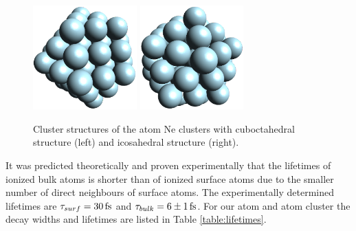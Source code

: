 \begin{figure}[h]
 \centering
 \includegraphics[height=4cm]{pics/fcc.png}
 \hspace{2cm}
 \includegraphics[height=4cm]{pics/ico.png}
 \caption{Cluster structures of the \unit[55]{atom} Ne clusters with
          cuboctahedral structure (left) and icosahedral structure (right).}
 \label{figure:Ne_clusters}
\end{figure}

It was predicted
theoretically and proven experimentally that the lifetimes of ionized bulk atoms
is shorter than of ionized surface atoms due to the smaller number of direct
neighbours of surface atoms. \cite{Santra01_3,Ohrwall04}
The experimentally determined lifetimes are
$\tau_{surf} = \unit[30]{fs}$ and $\tau_{bulk} = \unit[6\pm 1]{fs}$.
\cite{Ohrwall04}
For our \unit[55]{atom} and \unit[923]{atom} cluster the decay widths and lifetimes
are listed in Table \ref{table:lifetimes}.

